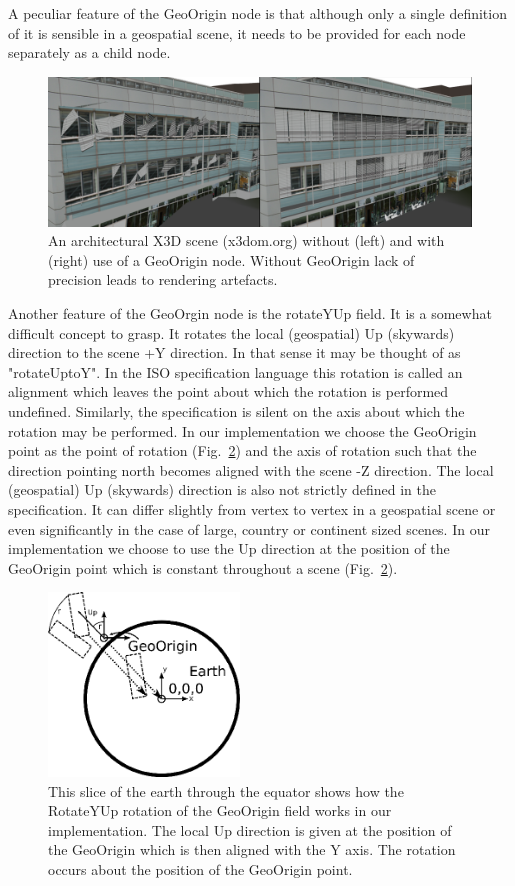 \documentclass{acmsiggraph}                     %
\begin{document}
A peculiar feature of the GeoOrigin node is that although only a single definition of it is sensible in a geospatial scene, it needs to be provided for each node separately as a child node.

\begin{figure}[htbp]
\centering
\includegraphics[width=6.6in]{GeoOriginImage.png}
\caption{An architectural X3D scene (x3dom.org) without (left) and with (right) use of a GeoOrigin node. Without GeoOrigin lack of precision leads to rendering artefacts.}
\label{fig:GeoOriginImage}
\end{figure}

Another feature of the GeoOrgin node is the rotateYUp field. It is a somewhat difficult concept to grasp. It rotates the local (geospatial) Up (skywards) direction to the scene +Y direction. In that sense it may be thought of as "rotateUptoY". In the ISO specification language this rotation is called an alignment which leaves the point about which the rotation is performed undefined. Similarly, the specification is silent on the axis about which the rotation may be performed. In our implementation we choose the GeoOrigin point as the point of rotation (Fig.~\ref{fig:RotateYUp}) and the axis of rotation such that the direction pointing north becomes aligned with the scene -Z direction. The local (geospatial) Up (skywards) direction is also not strictly defined in the specification. It can differ slightly from vertex to vertex in a geospatial scene or even significantly in the case of large, country  or continent sized scenes. In our implementation we choose to use the Up direction at the position of the GeoOrigin point which is constant throughout a scene (Fig.~\ref{fig:RotateYUp}).

\begin{figure}[htbp]
\centering
\includegraphics[width=2.0in]{RotateYUp.png}
\caption{This slice of the earth through the equator shows how the RotateYUp rotation of the GeoOrigin field works in our implementation. The local Up direction is given at the position of the GeoOrigin which is then aligned with the Y axis. The rotation occurs about the position of the GeoOrigin point.}
\label{fig:RotateYUp}
\end{figure}
\end{document}
